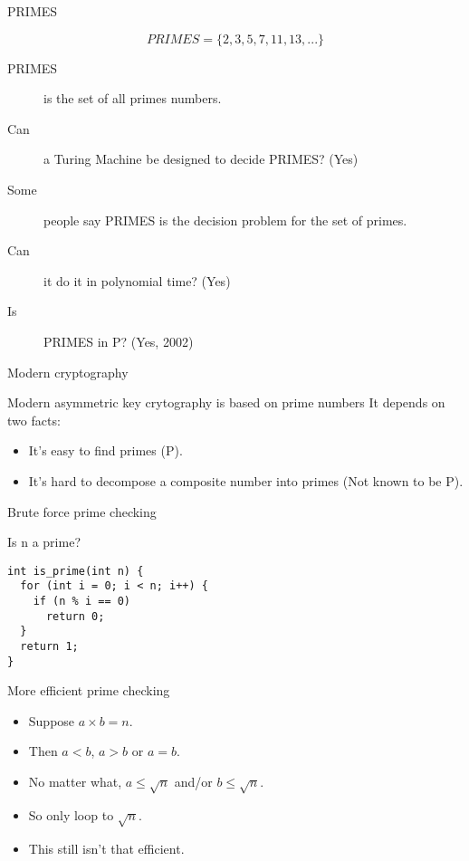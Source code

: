\begin{frame}{PRIMES}
  \begin{definition}
    $$ PRIMES = \{ 2, 3, 5, 7, 11, 13, ... \} $$
  \end{definition}
  \begin{description}
    \item[PRIMES] is the set of all primes numbers.
    \item[Can] a Turing Machine be designed to decide PRIMES? (Yes)
    \item[Some] people say PRIMES is the decision problem for the set of primes.
    \item[Can] it do it in polynomial time? (Yes)
    \item[Is] PRIMES in P? (Yes, 2002)
  \end{description}
\end{frame}

\begin{frame}{Modern cryptography}
  \begin{alertblock}{Modern asymmetric key crytography is based on prime numbers}
    It depends on two facts:
    \begin{itemize}
      \item It's easy to find primes (P).
      \item It's hard to decompose a composite number into primes (Not known to be P).
    \end{itemize}
  \end{alertblock}
\end{frame}

\begin{frame}[fragile]{Brute force prime checking}
  \begin{alertblock}{Is n a prime?}
    \begin{verbatim}
int is_prime(int n) {
  for (int i = 0; i < n; i++) {
    if (n % i == 0)
      return 0;
  }
  return 1;
}
    \end{verbatim}
  \end{alertblock}
\end{frame}

\begin{frame}[fragile]{More efficient prime checking}
  \begin{itemize}
    \item Suppose $a \times b = n$.
    \item Then $a < b$, $a > b$ or $a = b$.
    \item No matter what, $a \le \sqrt{n}$ and/or $b \le \sqrt{n}$.
    \item So only loop to $\sqrt{n}$.
    \item This still isn't that efficient.
  \end{itemize}
\end{frame}